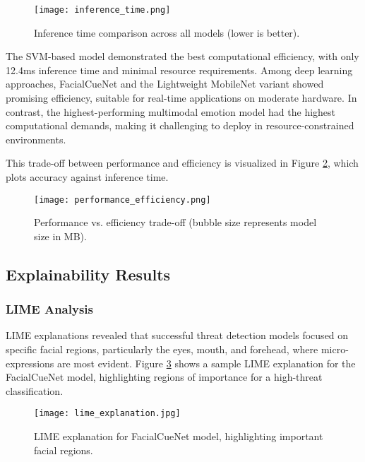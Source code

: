 \documentclass[conference,compsoc]{IEEEtran}
\begin{document}
\vspace{1cm}
\begin{figure}[htbp]
\centering
\texttt{[image: inference\_time.png]}
\caption{Inference time comparison across all models (lower is better).}
\label{fig:inference_time}
\end{figure}
\FloatBarrier

The SVM-based model demonstrated the best computational efficiency, with only 12.4ms inference time and minimal resource requirements. Among deep learning approaches, FacialCueNet and the Lightweight MobileNet variant showed promising efficiency, suitable for real-time applications on moderate hardware. In contrast, the highest-performing multimodal emotion model had the highest computational demands, making it challenging to deploy in resource-constrained environments.

This trade-off between performance and efficiency is visualized in Figure \ref{fig:performance_efficiency}, which plots accuracy against inference time.

\begin{figure}[htbp]
\centering
\texttt{[image: performance\_efficiency.png]}
\caption{Performance vs. efficiency trade-off (bubble size represents model size in MB).}
\label{fig:performance_efficiency}
\end{figure}
\FloatBarrier

\subsection{Explainability Results}
\FloatBarrier
\subsubsection{LIME Analysis}
LIME explanations revealed that successful threat detection models focused on specific facial regions, particularly the eyes, mouth, and forehead, where micro-expressions are most evident. Figure \ref{fig:lime_explanation} shows a sample LIME explanation for the FacialCueNet model, highlighting regions of importance for a high-threat classification.

\begin{figure}[!t]
\centering
\texttt{[image: lime\_explanation.jpg]}
\caption{LIME explanation for FacialCueNet model, highlighting important facial regions.}
\label{fig:lime_explanation}
\end{figure}
\FloatBarrier
\end{document}
